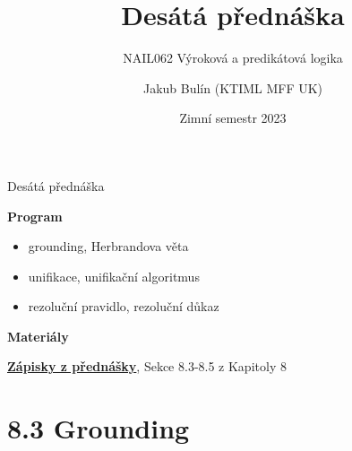\documentclass{beamer}
\title{Desátá přednáška}
\subtitle{NAIL062 Výroková a predikátová logika}
\author{Jakub Bulín (KTIML MFF UK)}
\date{Zimní semestr 2023}
\begin{document}
\maketitle


\begin{frame}{Desátá přednáška}

    \textbf{Program}
        \begin{itemize}
            \item grounding, Herbrandova věta
            \item unifikace, unifikační algoritmus
            \item rezoluční pravidlo, rezoluční důkaz
        \end{itemize}    

    \textbf{Materiály}

        \href{https://github.com/jbulin-mff-uk/nail062/raw/main/lecture/lecture-notes/lecture-notes.pdf}{\alert{\textbf{Zápisky z přednášky}}}, Sekce 8.3-8.5 z Kapitoly 8

\end{frame}


\section{8.3 Grounding}
\end{document}
